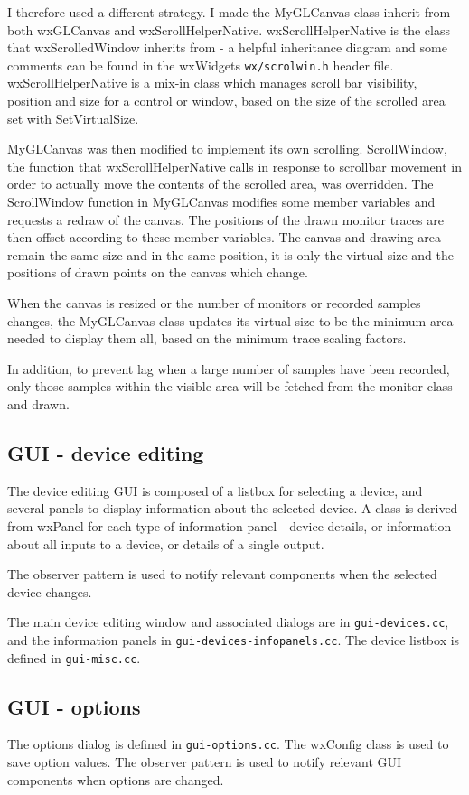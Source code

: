 \documentclass[a4paper,10pt]{article}
\begin{document}
I therefore used a different strategy. I made the MyGLCanvas class inherit from both wxGLCanvas and wxScrollHelperNative. wxScrollHelperNative is the class that wxScrolledWindow inherits from - a helpful inheritance diagram and some comments can be found in the wxWidgets \texttt{wx/scrolwin.h} header file. wxScrollHelperNative is a mix-in class which manages scroll bar visibility, position and size for a control or window, based on the size of the scrolled area set with SetVirtualSize. 

MyGLCanvas was then modified to implement its own scrolling. ScrollWindow, the function that wxScrollHelperNative calls in response to scrollbar movement in order to actually move the contents of the scrolled area, was overridden. The ScrollWindow function in MyGLCanvas modifies some member variables and requests a redraw of the canvas. The positions of the drawn monitor traces are then offset according to these member variables. The canvas and drawing area remain the same size and in the same position, it is only the virtual size and the positions of drawn points on the canvas which change. 

When the canvas is resized or the number of monitors or recorded samples changes, the MyGLCanvas class updates its virtual size to be the minimum area needed to display them all, based on the minimum trace scaling factors.

In addition, to prevent lag when a large number of samples have been recorded, only those samples within the visible area will be fetched from the monitor class and drawn. 

\subsection{GUI - device editing}
The device editing GUI is composed of a listbox for selecting a device, and several panels to display information about the selected device. A class is derived from wxPanel for each type of information panel - device details, or information about all inputs to a device, or details of a single output. 

The observer pattern is used to notify relevant components when the selected device changes. 

The main device editing window and associated dialogs are in \texttt{gui-devices.cc}, and the information panels in \texttt{gui-devices-infopanels.cc}. The device listbox is defined in \texttt{gui-misc.cc}.

\subsection{GUI - options}
The options dialog is defined in \texttt{gui-options.cc}. The wxConfig class is used to save option values. The observer pattern is used to notify relevant GUI components when options are changed. 
\end{document}
